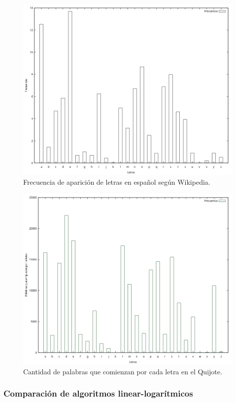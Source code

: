 \documentclass[12pt]{article}
\begin{document}
    \begin{figure}
        \centering
        \includegraphics[width=0.8\linewidth]{images/quicksort/graficas/string/Frecuencia-letras.png}
        \cprotect\caption{Frecuencia de aparición de letras en español según Wikipedia.}
        \label{fig:freq_wikipedia}
    \end{figure}
    \begin{figure}
        \centering
        \includegraphics[width=0.8\linewidth]{images/quicksort/graficas/string/Frecuencia-quijote.png}
        \cprotect\caption{Cantidad de palabras que comienzan por cada letra en el Quijote.}
        \label{fig:cant_quijote}
    \end{figure}
    
    
    \subsubsection{Comparación de algoritmos linear-logarítmicos}
\end{document}
